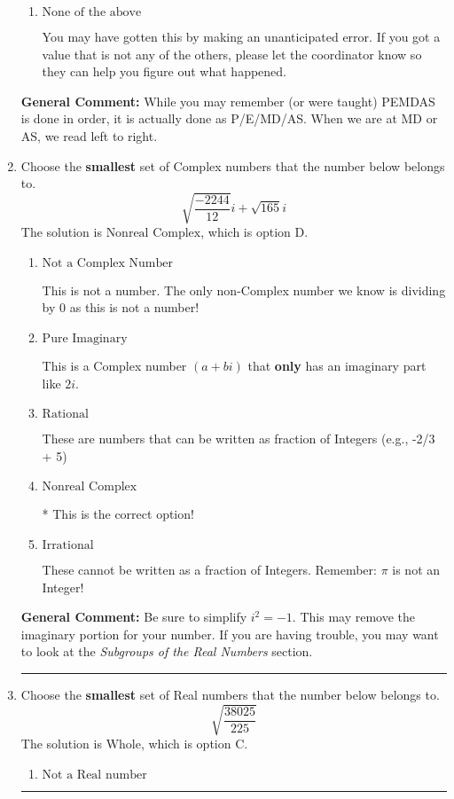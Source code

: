 \documentclass{extbook}[14pt]
\newcommand{\litem}[1]{\item #1

\rule{\textwidth}{0.4pt}}
\begin{document}
\begin{enumerate}
{\begin{enumerate}[label=\Alph*.]
 -23.975, which corresponds to an Order of Operations error: not reading left-to-right for multiplication/division.
\item \( \text{None of the above} \)

 You may have gotten this by making an unanticipated error. If you got a value that is not any of the others, please let the coordinator know so they can help you figure out what happened.
\end{enumerate}

\textbf{General Comment:} While you may remember (or were taught) PEMDAS is done in order, it is actually done as P/E/MD/AS. When we are at MD or AS, we read left to right.
}
\litem{
Choose the \textbf{smallest} set of Complex numbers that the number below belongs to.
\[ \sqrt{\frac{-2244}{12}} i+\sqrt{165}i \]The solution is \( \text{Nonreal Complex} \), which is option D.\begin{enumerate}[label=\Alph*.]
\item \( \text{Not a Complex Number} \)

This is not a number. The only non-Complex number we know is dividing by 0 as this is not a number!
\item \( \text{Pure Imaginary} \)

This is a Complex number $(a+bi)$ that \textbf{only} has an imaginary part like $2i$.
\item \( \text{Rational} \)

These are numbers that can be written as fraction of Integers (e.g., -2/3 + 5)
\item \( \text{Nonreal Complex} \)

* This is the correct option!
\item \( \text{Irrational} \)

These cannot be written as a fraction of Integers. Remember: $\pi$ is not an Integer!
\end{enumerate}

\textbf{General Comment:} Be sure to simplify $i^2 = -1$. This may remove the imaginary portion for your number. If you are having trouble, you may want to look at the \textit{Subgroups of the Real Numbers} section.
}
\litem{
Choose the \textbf{smallest} set of Real numbers that the number below belongs to.
\[ \sqrt{\frac{38025}{225}} \]The solution is \( \text{Whole} \), which is option C.\begin{enumerate}[label=\Alph*.]
\item \( \text{Not a Real number} \)


\end{enumerate}}
\end{enumerate}
\end{document}
